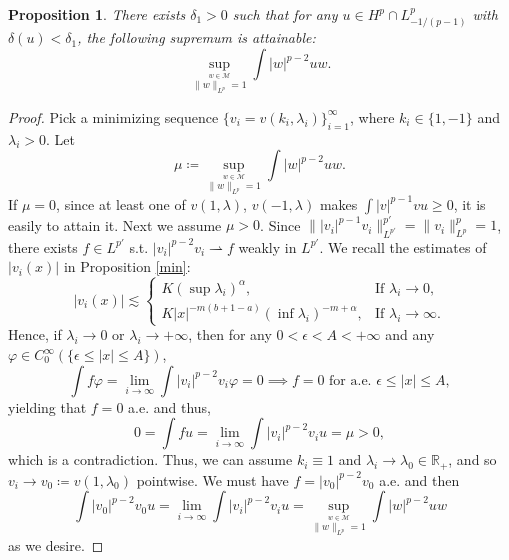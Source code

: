 \documentclass[11pt]{article}
\newtheorem{proposition}[theorem]{Proposition}
\newcommand{\R}{\mathbb{R}}
\numberwithin{equation}{section}
\begin{document}
\begin{proposition}\label{inf and max prop}
    There exists $\delta_1>0$ such that for any $u\in H^p\cap L^p_{-1/(p-1)}$ with $\delta(u)<\delta_1$, the following  supremum is attainable:
    \begin{equation}\label{inf and sup}
        \sup_{ \stackrel{w\in \mathcal{M}}{\|w\|_{L^p}=1} } \int |w|^{p-2}uw.
    \end{equation}
\end{proposition}
\begin{proof}
    Pick a minimizing sequence $\{v_i = v(k_i,\lambda_i)\}_{i=1}^\infty$, where $k_i\in \{1,-1\}$ and $\lambda_i>0$. Let
    \[ \mu \coloneqq \sup_{ \stackrel{w\in \mathcal{M}}{\|w\|_{L^p}=1} } \int |w|^{p-2}uw.\]
    If $\mu=0$, since at least one of $v(1,\lambda)$, $v(-1,\lambda)$ makes $\int |v|^{p-1}vu \ge 0$, it is easily to attain it. Next we assume $\mu>0$. Since $\||v_i|^{p-1}v_i\|_{L^{p'}}^{p'} = \|v_i\|_{L^p}^p = 1$, there exists $f\in L^{p'}$ s.t. $|v_i|^{p-2}v_i \rightharpoonup f$ weakly in $L^{p'}$. We recall the estimates of $|v_i(x)|$ in Proposition \ref{min}:
    \begin{equation*}
        |v_i(x)| \lesssim \begin{cases}
            K\left(\sup \lambda_i\right)^\alpha, & \text{If $\lambda_i\to 0$},\\
            K|x|^{-m(b+1-a)}\left(\inf \lambda_i\right)^{-m+\alpha}, & \text{If $\lambda_i\to \infty$}.
        \end{cases}
    \end{equation*}
    Hence, if $\lambda_i\to 0$ or $\lambda_i\to +\infty$, then for any $0<\epsilon<A<+\infty$ and any $\varphi \in C_0^\infty(\{\epsilon\le |x|\le A\})$,
    \begin{equation*}
        \int f\varphi = \lim_{i\to \infty} \int |v_i|^{p-2}v_i\varphi = 0 \implies f = 0 \,\,\text{for a.e. $\epsilon\le |x|\le A$},
    \end{equation*}
    yielding that $f=0$ a.e. and thus,
    \begin{equation*}
        0 = \int fu = \lim_{i\to \infty} \int |v_i|^{p-2}v_i u = \mu >0,
    \end{equation*}
    which is a contradiction. Thus, we can assume $k_i\equiv 1$ and $\lambda_i\to \lambda_0\in \R_+$, and so $v_i \to v_0\coloneqq v(1,\lambda_0)$ pointwise. We must have $f=|v_0|^{p-2}v_0$ a.e. and then
    \begin{equation*}
        \int |v_0|^{p-2}v_0u=\lim_{i\to \infty} \int |v_i|^{p-2}v_iu = \sup_{ \stackrel{w\in \mathcal{M}}{\|w\|_{L^p}=1} } \int |w|^{p-2}uw
    \end{equation*}
    as we desire.
\end{proof}
\end{document}
